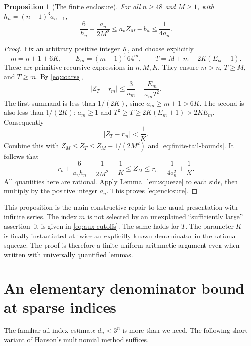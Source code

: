 \documentclass[11pt]{article}
\newtheorem{proposition}[theorem]{Proposition}
\theoremstyle{definition}\newtheorem{definition}[theorem]{Definition}
\theoremstyle{remark}\newtheorem{remark}[theorem]{Remark}
\newcommand{\abs}[1]{\left|#1\right|}\newcommand{\floor}[1]{\left\lfloor#1\right\rfloor}
\begin{document}
\begin{proposition}[The finite enclosure]\label{prop:enclosure}
For all $n\ge48$ and $M\ge1$, with $h_n=(n+1)^3a_{n+1}$,
\begin{equation}\label{eq:enclosure}
 \boxed{\quad
 \frac6{h_n}-\frac{a_n}{2M^2}
 \le a_nZ_M-b_n\le\frac1{4a_n}.
 \quad}
\end{equation}
\end{proposition}
\begin{proof}
Fix an arbitrary positive integer $K$, and choose explicitly
\begin{equation}\label{eq:aux-cutoffs}
 m=n+1+6K,\qquad
 E_m=(m+1)^3\,64^m,\qquad
 T=M+m+2K(E_m+1).
\end{equation}
These are primitive recursive expressions in $n,M,K$.
They ensure $m>n$, $T\ge M$, and $T\ge m$.
By \eqref{eq:coarse},
\[
 \abs{Z_T-r_m}\le\frac3{a_m}+\frac{E_m}{a_mT^2}.
\]
The first summand is less than $1/(2K)$, since
$a_m\ge m+1>6K$. The second is also less than $1/(2K)$:
$a_m\ge1$ and $T^2\ge T\ge2K(E_m+1)>2KE_m$.
Consequently
\begin{equation}\label{eq:aux-close}
 \abs{Z_T-r_m}<\frac1K.
\end{equation}
Combine this with $Z_M\le Z_T\le Z_M+1/(2M^2)$ and
\eqref{eq:finite-tail-bounds}. It follows that
\[
 r_n+\frac6{a_nh_n}-\frac1{2M^2}-\frac1K
 \le Z_M
 \le r_n+\frac1{4a_n^2}+\frac1K.
\]
All quantities here are rational. Apply Lemma~\ref{lem:squeeze} to each
side, then multiply by the positive integer $a_n$. This proves
\eqref{eq:enclosure}.
\end{proof}

This proposition is the main constructive repair to the usual presentation
with infinite series. The index $m$ is not selected by an unexplained
``sufficiently large'' assertion; it is given in \eqref{eq:aux-cutoffs}.
The same holds for $T$. The parameter $K$ is finally instantiated at twice
an explicitly known denominator in the rational squeeze. The proof is
therefore a finite uniform arithmetic argument even when written with
universally quantified lemmas.

\section{An elementary denominator bound at sparse indices}\label{sec:lcm}
The familiar all-index estimate $d_n<3^n$ is more than we need. The following
short variant of Hanson's multinomial method \cite{Hanson} suffices.
\end{document}
